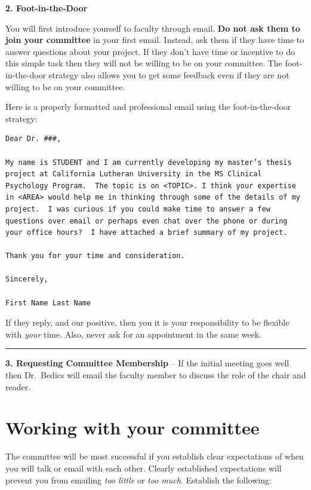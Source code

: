 \documentclass[openany]{book}
\begin{document}
\textbf{2. Foot-in-the-Door}

You will first introduce yourself to faculty through email. \textbf{Do not ask them to join your committee} in your first email. Instead, ask them if they have time to answer questions about your project. If they don't have time or incentive to do this simple task then they will not be willing to be on your committee. The foot-in-the-door strategy also allows you to get some feedback even if they are not willing to be on your committee.

Here is a properly formatted and professional email using the foot-in-the-door strategy:

\begin{verbatim}
Dear Dr. ###,

My name is STUDENT and I am currently developing my master’s thesis project at California Lutheran University in the MS Clinical Psychology Program.  The topic is on <TOPIC>. I think your expertise in <AREA> would help me in thinking through some of the details of my project.  I was curious if you could make time to answer a few questions over email or perhaps even chat over the phone or during your office hours?  I have attached a brief summary of my project.

Thank you for your time and consideration.

Sincerely,

First Name Last Name
\end{verbatim}

If they reply, and our positive, then you it is your responsibility to be flexible with \emph{your} time. Also, never ask for an appointment in the same week.

\begin{center}\rule{0.5\linewidth}{0.5pt}\end{center}

\textbf{3. Requesting Committee Membership} -- If the initial meeting goes well then Dr.~Bedics will email the faculty member to discuss the role of the chair and reader.

\hypertarget{working-with-your-committee}{%
\section{Working with your committee}\label{working-with-your-committee}}

The committee will be most successful if you establish clear expectations of when you will talk or email with each other. Clearly established expectations will prevent you from emailing \emph{too little} or \emph{too much}. Establish the following:
\end{document}
